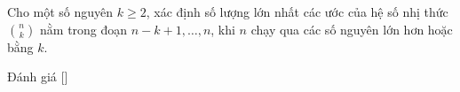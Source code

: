 \ifshowproblem
\begin{problem}\label{problem:ROU-2015-TST-D4-P2}
    Cho một số nguyên \( k \geq 2 \), xác định số lượng lớn nhất các ước của hệ số nhị thức \( \binom{n}{k} \) nằm trong đoạn 
    \( n - k + 1, \ldots, n \), khi \( n \) chạy qua các số nguyên lớn hơn hoặc bằng \( k \).
\end{problem}
\fi

\ifshowinfo
Đánh giá [\textbf{}]\footnotemark
{}
\fi